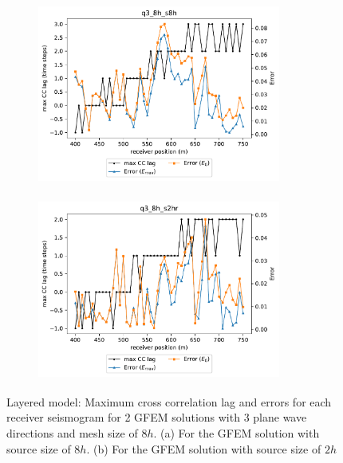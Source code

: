  \begin{figure}[h!]
 		\centering
		\begin{subfigure}{8cm}
				\includegraphics[width=8cm, height=6cm]{Thesis_Edith/figures/layered_model/layer_waves/Err_q3_8h_s8h.pdf}
			     \caption{}
		\end{subfigure}
        \hspace{0.25cm}	
		\begin{subfigure}{8cm}
				\includegraphics[width=8cm, height=6cm]{Thesis_Edith/figures/layered_model/layer_waves/Err_q3_8h_s2hr.pdf}
			   \caption{}
		\end{subfigure}
 
	\caption{Layered model: Maximum cross correlation lag and errors for each receiver seismogram for 2 GFEM solutions with 3 plane wave directions and mesh size of $8h$. (a) For the GFEM solution with source size of $8h$. (b) For the GFEM solution with source size of $2h$}
	\label{fig:3.20}
\end{figure}

